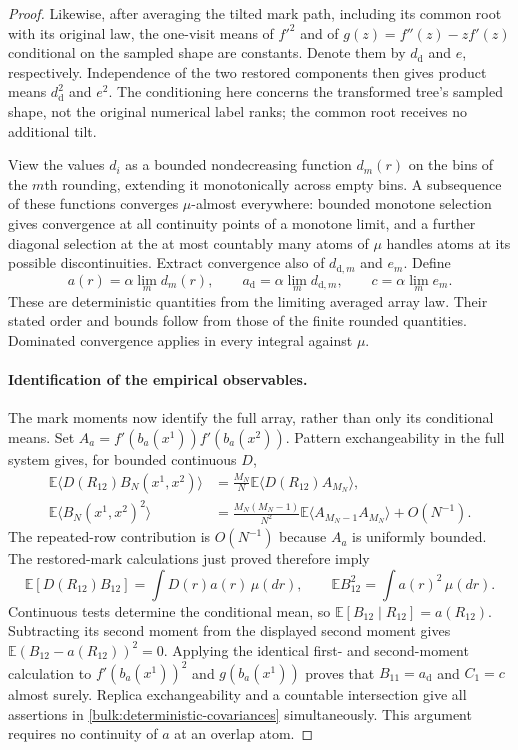 \begin{proof}
Likewise, after averaging the tilted mark path, including its common
root with its original law, the one-visit means of $f'^2$ and of
$g(z)=f''(z)-zf'(z)$ conditional on the sampled shape are constants.
Denote them by $d_{\mathrm d}$ and $e$, respectively.  Independence of
the two restored components then gives product means
$d_{\mathrm d}^2$ and $e^2$.  The conditioning here concerns the
transformed tree's sampled shape, not the original numerical label
ranks; the common root receives no additional tilt.

View the values $d_i$ as a bounded nondecreasing function $d_m(r)$ on
the bins of the $m$th rounding, extending it monotonically across empty
bins.  A subsequence of these functions converges $\mu$-almost
everywhere: bounded monotone selection gives convergence at all
continuity points of a monotone limit, and a further diagonal selection
at the at most countably many atoms of $\mu$ handles atoms at its
possible discontinuities.  Extract convergence also of
$d_{\mathrm d,m}$ and $e_m$.  Define
\[
 a(r)=\alpha\lim_m d_m(r),\qquad
 a_{\mathrm d}=\alpha\lim_m d_{\mathrm d,m},\qquad
 c=\alpha\lim_m e_m.
\]
These are deterministic quantities from the limiting averaged array
law.  Their stated order and bounds follow from those of the finite
rounded quantities.  Dominated convergence applies in every integral
against $\mu$.

\paragraph{Identification of the empirical observables.}
The mark moments now identify the full array, rather than only its
conditional means.  Set
$A_a=f'(b_a(x^1))f'(b_a(x^2))$.
Pattern exchangeability in the full system gives, for bounded continuous
$D$,
\begin{align*}
 \mathbb E\langle D(R_{12})B_N(x^1,x^2)\rangle
   &=\frac{M_N}{N}\mathbb E\langle D(R_{12})A_{M_N}\rangle,\\
 \mathbb E\langle B_N(x^1,x^2)^2\rangle
   &=\frac{M_N(M_N-1)}{N^2}
           \mathbb E\langle A_{M_N-1}A_{M_N}\rangle+O(N^{-1}).
\end{align*}
The repeated-row contribution is $O(N^{-1})$ because $A_a$ is uniformly
bounded.  The restored-mark calculations just proved therefore imply
\[
 \mathbb E[D(R_{12})B_{12}]=\int D(r)a(r)\,\mu(dr),
 \qquad \mathbb E B_{12}^2=\int a(r)^2\,\mu(dr).
\]
Continuous tests determine the conditional mean, so
$\mathbb E[B_{12}\mid R_{12}]=a(R_{12})$.  Subtracting its second moment
from the displayed second moment gives
$\mathbb E(B_{12}-a(R_{12}))^2=0$.
Applying the identical first- and second-moment calculation to
$f'(b_a(x^1))^2$ and $g(b_a(x^1))$ proves that $B_{11}=a_{\mathrm d}$ and
$C_1=c$ almost surely.  Replica exchangeability and a countable
intersection give all assertions in
\eqref{bulk:deterministic-covariances} simultaneously.  This argument
requires no continuity of $a$ at an overlap atom.


\end{proof}
